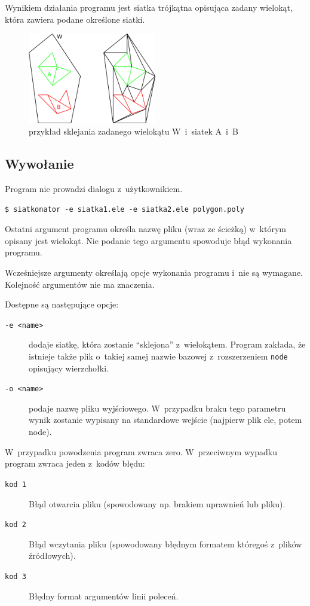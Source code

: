 \documentclass[a4paper]{article} \usepackage{setspace}
\begin{document}
Wynikiem działania programu jest siatka trójkątna opisująca zadany wielokąt, która zawiera podane określone siatki.

\begin{figure}[h]
  \centering
  \includegraphics[width=0.5\textwidth]{ilustracja.png}
  \caption{przykład sklejania zadanego wielokątu W~i~siatek A~i~B}
\end{figure}

\subsection{Wywołanie}
Program nie prowadzi dialogu z~użytkownikiem.

\begin{lstlisting}[caption=Przykładowe wywołanie]
  $ siatkonator -e siatka1.ele -e siatka2.ele polygon.poly
\end{lstlisting}

Ostatni argument programu określa nazwę pliku (wraz ze ścieżką) w~którym opisany jest wielokąt.
Nie podanie tego argumentu spowoduje błąd wykonania programu.

Wcześniejsze argumenty określają opcje wykonania programu i~nie są wymagane.
Kolejność argumentów nie ma znaczenia.

Dostępne są następujące opcje:
\begin{description}
  \item[\texttt{-e <name>}] dodaje siatkę, która zostanie ``sklejona'' z~wielokątem. Program zakłada, że istnieje także plik o~takiej samej nazwie bazowej z~rozszerzeniem \texttt{node} opisujący wierzchołki.
  \item[\texttt{-o <name>}] podaje nazwę pliku wyjściowego. W~przypadku braku tego parametru wynik zostanie wypisany na standardowe wejście (najpierw plik ele, potem node).
\end{description}

W~przypadku powodzenia program zwraca zero. W~przeciwnym wypadku program zwraca jeden z~kodów błędu:

\begin{description}
  \item[\texttt{kod 1}] Błąd otwarcia pliku (spowodowany np. brakiem uprawnień lub pliku).
  \item[\texttt{kod 2}] Błąd wczytania pliku (spowodowany błędnym formatem któregoś z~plików źródłowych).
  \item[\texttt{kod 3}] Błędny format argumentów linii poleceń.
\end{description}
\end{document}
